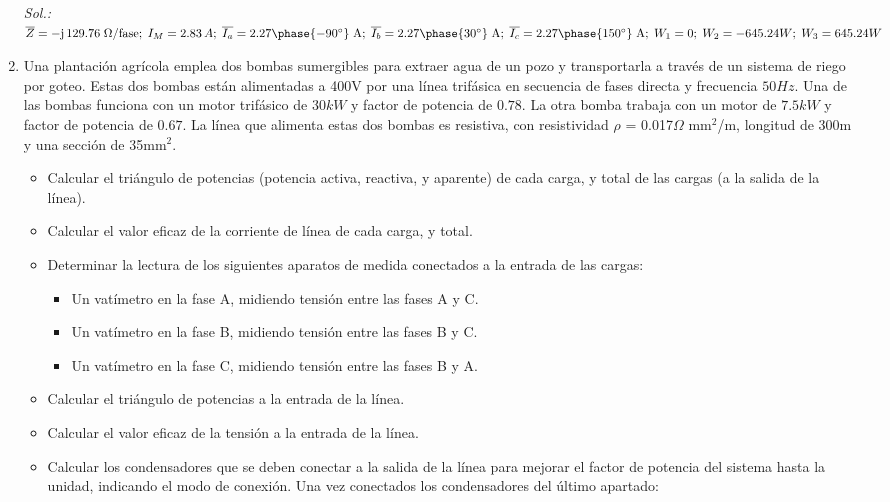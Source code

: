 \begin{enumerate}
  \emph{Sol.:
    $\overline{Z}={-\mathrm{j}\,129.76}\;\Omega\text{/fase};\;
    I_M=2.83\,A;\;\overline{I_{a}}={2.27\phase{-90^\circ}\;\text{A}};\;
    \overline{I_{b}}={2.27\phase{30^\circ}\;\text{A}};\;
    \overline{I_{c}}={2.27\phase{150^\circ}\;\text{A}};\; W_1=0;\;
    W_2=-645.24W;\; W_3=645.24W$}

\item Una plantación agrícola emplea dos bombas sumergibles para
  extraer agua de un pozo y transportarla a través de un sistema de
  riego por goteo. Estas dos bombas están alimentadas a {400}{V} por
  una línea trifásica en secuencia de fases directa y frecuencia
  ${50}{Hz}$. Una de las bombas funciona con un motor trifásico de
  ${30}{kW}$ y factor de potencia de $0.78$. La otra bomba trabaja con
  un motor de ${7.5}{kW}$ y factor de potencia de $0.67$. La línea que
  alimenta estas dos bombas es resistiva, con resistividad $\rho$ =
  {0.017}{$\Omega$ mm$^2$/m}, longitud de {300}{m} y una sección de
  {35}{mm$^2$}.
  \begin{itemize}
  \item Calcular el triángulo de potencias (potencia activa, reactiva,
    y aparente) de cada carga, y total de las cargas (a la salida de
    la línea).
  \item Calcular el {valor eficaz} de la corriente de línea de cada
    carga, y total.
  \item Determinar la lectura de los siguientes aparatos de medida
    conectados a la entrada de las cargas:
    \begin{itemize}
    \item Un vatímetro en la fase A, midiendo tensión entre las fases
      A y C.
    \item Un vatímetro en la fase B, midiendo tensión entre las fases
      B y C.
    \item Un vatímetro en la fase C, midiendo tensión entre las fases
      B y A.
    \end{itemize}
  \item Calcular el triángulo de potencias a la entrada de la línea.
  \item Calcular el {valor eficaz} de la tensión a la entrada de la
    línea.
  \item Calcular los condensadores que se deben conectar a la salida
    de la línea para mejorar el factor de potencia del sistema hasta
    la unidad, indicando el modo de conexión.  Una vez conectados los
    condensadores del último apartado:
    \begin{itemize}

\end{itemize}
\end{itemize}
\end{enumerate}
